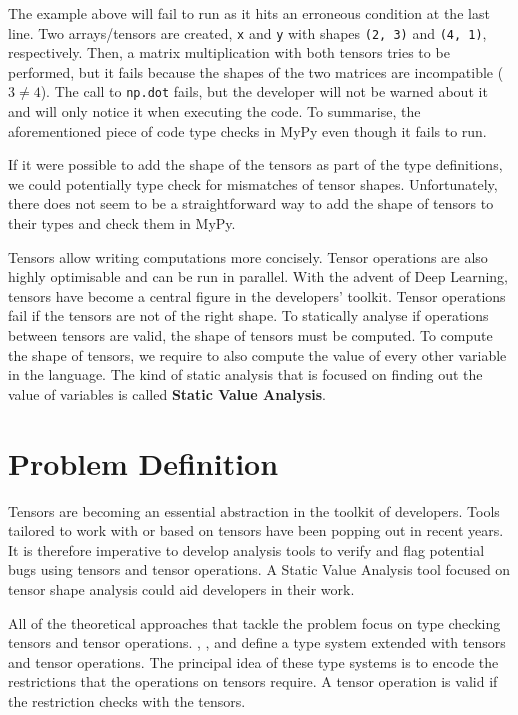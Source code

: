The example above will fail to run as it hits an erroneous condition at the last line. Two
arrays/tensors are created, \texttt{x} and \texttt{y} with shapes \texttt{(2,\ 3)} and
\texttt{(4,\ 1)}, respectively. Then, a matrix multiplication with both tensors tries to
be performed, but it fails because the shapes of the two matrices are incompatible
(\(3 \ne 4\)). The call to \texttt{np.dot} fails, but the developer will not be warned about
it and will only notice it when executing the code. To summarise, the aforementioned piece
of code type checks in MyPy even though it fails to run.

If it were possible to add the shape of the tensors as part of the type definitions, we
could potentially type check for mismatches of tensor shapes. Unfortunately, there does
not seem to be a straightforward way to add the shape of tensors to their types and check
them in MyPy.

Tensors allow writing computations more concisely. Tensor operations are also highly
optimisable and can be run in parallel. With the advent of Deep Learning, tensors have
become a central figure in the developers' toolkit. Tensor operations fail if the tensors
are not of the right shape. To statically analyse if operations between tensors are valid,
the shape of tensors must be computed. To compute the shape of tensors, we require to
also compute the value of every other variable in the language. The kind of static
analysis that is focused on finding out the value of variables is called \textbf{Static
Value Analysis}.

\section{Problem Definition}\label{problem-definition}

Tensors are becoming an essential abstraction in the toolkit of developers. Tools tailored
to work with or based on tensors have been popping out in recent years. It is therefore
imperative to develop analysis tools to verify and flag potential bugs using tensors and
tensor operations. A Static Value Analysis tool focused on tensor shape analysis could aid
developers in their work.

All of the theoretical approaches that tackle the problem focus on type checking tensors
and tensor operations. \textcite{griffioen_type_2015},
\textcite{slepak_array-oriented_2014}, and \textcite{rink_modeling_2018} define a type
system extended with tensors and tensor operations. The principal idea of these type
systems is to encode the restrictions that the operations on tensors require. A tensor
operation is valid if the restriction checks with the tensors.

